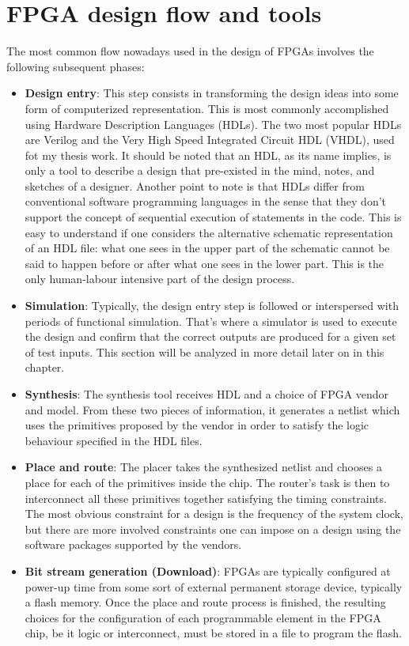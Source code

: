 \section{FPGA design flow and tools}
\noindent The most common flow nowadays used in the design of FPGAs involves the following
subsequent phases:
\begin{itemize}
	\item \textbf{Design entry}: This step consists in transforming the design ideas into some form of
	computerized representation. This is most commonly accomplished using Hardware Description
	Languages (HDLs). The two most popular HDLs are Verilog and the Very High Speed
	Integrated Circuit HDL (VHDL), used fot my thesis work. It should be noted that an HDL, as its name implies, is only
	a tool to describe a design that pre-existed in the mind, notes, and sketches of a designer. Another point to note is that HDLs differ from
	conventional software programming languages in the sense that they don’t support the concept
	of sequential execution of statements in the code. This is easy to understand if one considers the
	alternative schematic representation of an HDL file: what one sees in the upper part of the
	schematic cannot be said to happen before or after what one sees in the lower part.
	This is the only human-labour intensive part of the design process.
	\item \textbf{Simulation}: Typically, the design entry step is followed or interspersed with periods of functional simulation. That's where a simulator is used to execute the design and confirm that the correct outputs are produced for a given set of test inputs\cite{fpga4}. This section will be analyzed in more detail later on in this chapter.
	\item \textbf{Synthesis}: The synthesis tool receives HDL and a choice of FPGA vendor and model. From
	these two pieces of information, it generates a netlist which uses the primitives proposed by the
	vendor in order to satisfy the logic behaviour specified in the HDL files.
	\item \textbf{Place and route}: The placer takes the synthesized netlist and chooses a place for each of the
	primitives inside the chip. The router’s task is then to interconnect all these primitives together
	satisfying the timing constraints. The most obvious constraint for a design is the frequency of
	the system clock, but there are more involved constraints one can impose on a design using the
	software packages supported by the vendors.
	\item \textbf{Bit stream generation (Download)}: FPGAs are typically configured at power-up time from some sort of
	external permanent storage device, typically a flash memory. Once the place and route process is
	finished, the resulting choices for the configuration of each programmable element in the FPGA
	chip, be it logic or interconnect, must be stored in a file to program the flash.
	
\end{itemize}

